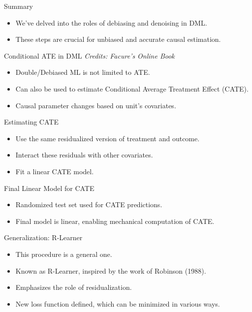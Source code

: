 \documentclass{beamer}
\begin{document}
\begin{frame}{Summary}
  \begin{itemize}
    \item We've delved into the roles of debiasing and denoising in DML.
    \item These steps are crucial for unbiased and accurate causal estimation.
  \end{itemize}
\end{frame}


\begin{frame}{Conditional ATE in DML}
  \textit{Credits: Facure's Online Book}
  \begin{itemize}
    \item Double/Debiased ML is not limited to ATE.
    \item Can also be used to estimate Conditional Average Treatment Effect (CATE).
    \item Causal parameter changes based on unit's covariates.
  \end{itemize}
\end{frame}

\begin{frame}{Estimating CATE}
  \begin{itemize}
    \item Use the same residualized version of treatment and outcome.
    \item Interact these residuals with other covariates.
    \item Fit a linear CATE model.
  \end{itemize}
\end{frame}

\begin{frame}{Final Linear Model for CATE}
  \begin{itemize}
    \item Randomized test set used for CATE predictions.
    \item Final model is linear, enabling mechanical computation of CATE.
  \end{itemize}
\end{frame}

\begin{frame}{Generalization: R-Learner}
  \begin{itemize}
    \item This procedure is a general one.
    \item Known as R-Learner, inspired by the work of Robinson (1988).
    \item Emphasizes the role of residualization.
    \item New loss function defined, which can be minimized in various ways.
  \end{itemize}
\end{frame}
\end{document}
